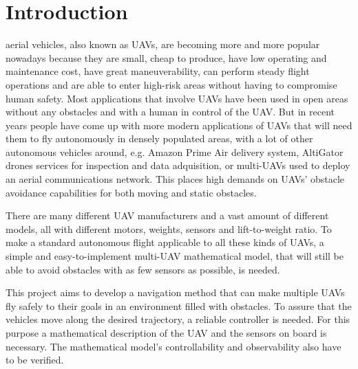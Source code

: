 \documentclass[journal]{IEEEtran}
\begin{document}
	\section{Introduction}
	 aerial vehicles, also known as UAVs, are becoming more and more popular nowadays because they are small, cheap to produce, have low operating and maintenance cost, have great maneuverability, can perform steady flight operations and are able to enter high-risk areas without having to compromise human safety. Most applications that involve UAVs have been used in open areas without any obstacles and with a human in control of the UAV. But in recent years people have come up with more modern applications of UAVs that will need them to fly autonomously in densely populated areas, with a lot of other autonomous vehicles around, e.g. Amazon Prime Air delivery system, AltiGator drones services for inspection and data adquisition, or multi-UAVs used to deploy an aerial communications network. This places high demands on UAVs’ obstacle avoidance capabilities for both moving and static obstacles.
	
	There are many different UAV manufacturers and a vast amount of different models, all with different motors, weights, sensors and lift-to-weight ratio. To make a standard autonomous flight applicable to all these kinds of UAVs, a simple and easy-to-implement multi-UAV mathematical model, that will still be able to avoid obstacles with as few sensors as possible, is needed.
	
	This project aims to develop a navigation method that can make multiple UAVs fly safely to their goals in an environment filled with obstacles. To assure that the vehicles move along the desired trajectory, a reliable controller is needed. For this purpose a mathematical description of the UAV and the sensors on board is necessary. The mathematical model's controllability and observability also have to be verified. 
	
\end{document}
